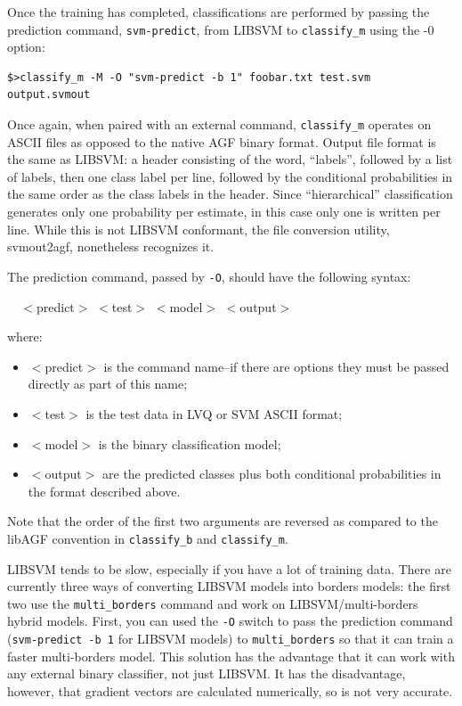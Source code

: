 \documentclass[12pt]{article}
\begin{document}
Once the training has completed, classifications are performed by passing the prediction command, \verb"svm-predict", from LIBSVM to \verb"classify_m" using the -0 option:

\begin{verbatim}
$>classify_m -M -O "svm-predict -b 1" foobar.txt test.svm output.svmout
\end{verbatim}

Once again, when paired with an external command, \verb/classify_m/ operates on ASCII files as opposed to the native AGF binary format. Output file format is the same as LIBSVM: a header consisting of the word, ``labels'', followed by a list of labels, then one class label per line, followed by the conditional probabilities in the same order as the class labels in the header. Since ``hierarchical'' classification generates only one probability per estimate, in this case only one is written per line.  While this is not LIBSVM conformant, the file conversion utility, svmout2agf, nonetheless recognizes it.  

The prediction command, passed by \verb"-O", should have the following syntax:

\verb/  /$<$predict$>$ $<$test$>$ $<$model$>$ $<$output$>$

where:
\begin{itemize}
\item $<$predict$>$ is the command name--if there are options they must be passed directly as part of this name;
\item $<$test$>$ is the test data in LVQ or SVM ASCII format;
\item $<$model$>$ is the binary classification model;
\item $<$output$>$ are the predicted classes plus both conditional probabilities in the format described above.
\end{itemize}
Note that the order of the first two arguments are reversed as compared to the libAGF convention in \verb/classify_b/ and \verb/classify_m/.

LIBSVM tends to be slow, especially if you have a lot of training data.  
There are currently three ways of converting LIBSVM models into borders
models: the first two use the \verb/multi_borders/ command and work on
LIBSVM/multi-borders hybrid models.
First, you can used the \verb/-O/ switch to pass the prediction command 
(\verb/svm-predict -b 1/ for LIBSVM models) to
\verb/multi_borders/ so that it can train a faster multi-borders model.
This solution has the advantage that it can work with any external binary
classifier, not just LIBSVM.
It has the disadvantage, however, that gradient vectors are calculated
numerically, so is not very accurate.
\end{document}
